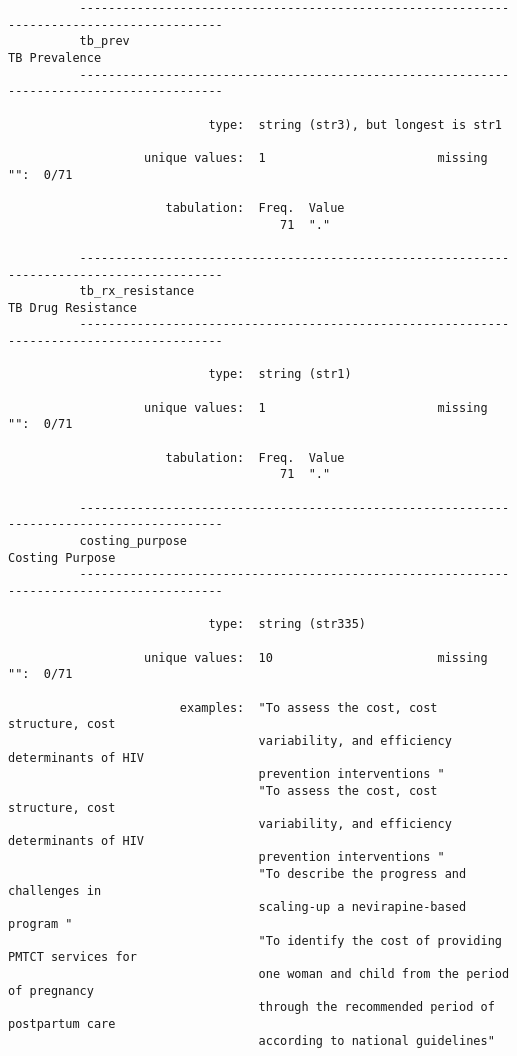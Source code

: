 \documentclass{article}
\begin{document}
\begin{verbatim}
          ------------------------------------------------------------------------------------------
          tb_prev                                                                      TB Prevalence
          ------------------------------------------------------------------------------------------
          
                            type:  string (str3), but longest is str1
          
                   unique values:  1                        missing "":  0/71
          
                      tabulation:  Freq.  Value
                                      71  "."
          
          ------------------------------------------------------------------------------------------
          tb_rx_resistance                                                        TB Drug Resistance
          ------------------------------------------------------------------------------------------
          
                            type:  string (str1)
          
                   unique values:  1                        missing "":  0/71
          
                      tabulation:  Freq.  Value
                                      71  "."
          
          ------------------------------------------------------------------------------------------
          costing_purpose                                                            Costing Purpose
          ------------------------------------------------------------------------------------------
          
                            type:  string (str335)
          
                   unique values:  10                       missing "":  0/71
          
                        examples:  "To assess the cost, cost structure, cost
                                   variability, and efficiency determinants of HIV
                                   prevention interventions "
                                   "To assess the cost, cost structure, cost
                                   variability, and efficiency determinants of HIV
                                   prevention interventions "
                                   "To describe the progress and challenges in
                                   scaling-up a nevirapine-based program "
                                   "To identify the cost of providing PMTCT services for
                                   one woman and child from the period of pregnancy
                                   through the recommended period of postpartum care
                                   according to national guidelines"
          

\end{verbatim}
\end{document}
